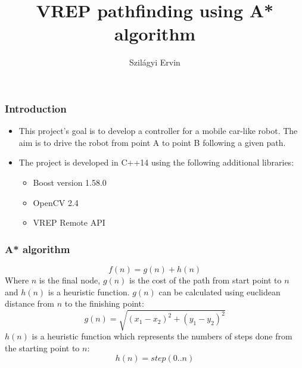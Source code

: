 \documentclass{beamer}
\title{VREP pathfinding using A* algorithm}
\author[Szilagyi Ervin]{Szil\'{a}gyi Ervin}
\institute{Sapientia EMTE}
\begin{document}
	
	\begin{frame}
		\titlepage
	\end{frame}
	
	\begin{frame}
		\frametitle{Introduction}
		\begin{itemize}
			\item This project's goal is to develop a controller for a mobile car-like robot. The aim is to drive the robot from point A to point B following a given path.
			\item
			The project is developed in C++14 using the following additional libraries:
			\begin{itemize}
				\item Boost version 1.58.0
				\item OpenCV 2.4
				\item VREP Remote API 
			\end{itemize}
		\end{itemize}
	\end{frame}
	
	\begin{frame}
		\frametitle{A* algorithm}
		\begin{equation}
			f(n) = g(n) + h(n)
		\end{equation}
		Where $n$ is the final node, $g(n)$ is the cost of the path from start point to $n$ and $h(n)$ is a heuristic function.
		$g(n)$ can be calculated using euclidean distance from $n$ to the finishing point:
		\begin{equation}
		g(n) = \sqrt{(x_1 - x_2)^2 + (y_1 - y_2)^2}
		\end{equation}
		$h(n)$ is a heuristic function which represents the numbers of steps done from the starting point to $n$:
		\begin{equation}
		h(n) = step(0..n)
		\end{equation}
	\end{frame}
	
\end{document}
